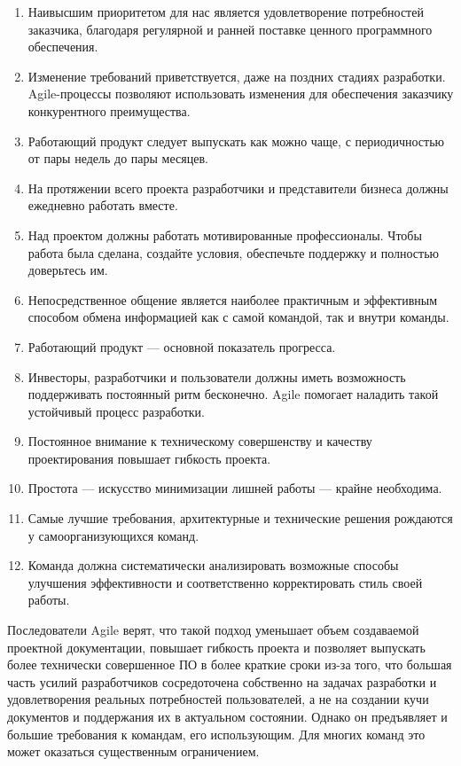 \documentclass{../../text-style}
\begin{document}
\begin{enumerate}
    \item Наивысшим приоритетом для нас является удовлетворение потребностей заказчика, благодаря регулярной и ранней поставке ценного программного обеспечения.
    \item Изменение требований приветствуется, даже на поздних стадиях разработки. Agile-процессы позволяют использовать изменения для обеспечения заказчику конкурентного преимущества.
    \item Работающий продукт следует выпускать как можно чаще, с периодичностью от пары недель до пары месяцев.
    \item На протяжении всего проекта разработчики и представители бизнеса должны ежедневно работать вместе.
    \item Над проектом должны работать мотивированные профессионалы. Чтобы работа была сделана, создайте условия, обеспечьте поддержку и полностью доверьтесь им.
    \item Непосредственное общение является наиболее практичным и эффективным способом обмена информацией как с самой командой, так и внутри команды.
    \item Работающий продукт --- основной показатель прогресса.
    \item Инвесторы, разработчики и пользователи должны иметь возможность поддерживать постоянный ритм бесконечно. Agile помогает наладить такой устойчивый процесс разработки.
    \item Постоянное внимание к техническому совершенству и качеству проектирования повышает гибкость проекта.
    \item Простота --- искусство минимизации лишней работы --- крайне необходима.
    \item Самые лучшие требования, архитектурные и технические решения рождаются у самоорганизующихся команд.
    \item Команда должна систематически анализировать возможные способы улучшения эффективности и соответственно корректировать стиль своей работы.
\end{enumerate}

Последователи Agile верят, что такой подход уменьшает объем создаваемой проектной документации, повышает гибкость проекта и позволяет выпускать более технически совершенное ПО в более краткие сроки из-за того, что большая часть усилий разработчиков сосредоточена собственно на задачах разработки и удовлетворения реальных потребностей пользователей, а не на создании кучи документов и поддержания их в актуальном состоянии. Однако он предъявляет и большие требования к командам, его использующим. Для многих команд это может оказаться существенным ограничением.
\end{document}
